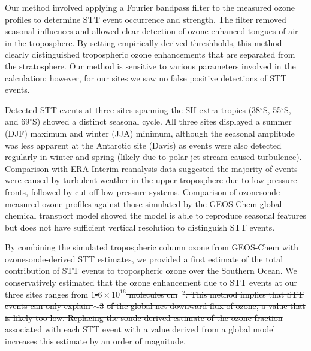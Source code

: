 \documentclass[acp, manuscript]{copernicus} %
\providecommand{\DIFadd}[1]{{\protect\color{blue}\uwave{#1}}} %
\providecommand{\DIFdel}[1]{{\protect\color{red}\sout{#1}}}                      %
\providecommand{\DIFaddbegin}{} %
\providecommand{\DIFaddend}{} %
\providecommand{\DIFdelbegin}{} %
\providecommand{\DIFdelend}{} %
\begin{document}
Our method involved applying a Fourier bandpass filter to the measured ozone profiles to determine STT event occurrence and strength.
The filter removed seasonal influences and allowed clear detection of ozone-enhanced tongues of air in the troposphere.
By setting empirically-derived threshholds, this method clearly distinguished tropospheric ozone enhancements that are separated from the stratosphere.
Our method is sensitive to various parameters involved in the calculation; however, for our sites we saw no false positive detections of STT events.

Detected STT events at three sites spanning the SH extra-tropics (38$^{\circ}$S, 55$^{\circ}$S, and 69$^{\circ}$S) showed a distinct seasonal cycle.
All three sites displayed a summer (DJF) maximum and winter (JJA) minimum, although the seasonal amplitude was less apparent at the Antarctic site (Davis) as events were also detected regularly in winter and spring (likely due to polar jet stream-caused turbulence).  %
Comparison with ERA-Interim reanalysis data suggested the majority of events were caused by turbulent weather in the upper troposphere due to low pressure fronts, followed by cut-off low pressure systems.
Comparison of ozonesonde-measured ozone profiles against those simulated by the GEOS-Chem global chemical transport model showed the model is able to reproduce seasonal features but does not have sufficient vertical resolution to distinguish STT events.

By combining the simulated tropospheric column ozone from GEOS-Chem with ozonesonde-derived STT estimates, we \DIFdelbegin \DIFdel{provided }\DIFdelend \DIFaddbegin \DIFadd{provide }\DIFaddend a first estimate of the total contribution of STT events to tropospheric ozone over the Southern Ocean.
We conservatively estimated that the ozone enhancement due to STT events at our three sites ranges from \DIFdelbegin \DIFdel{$1$-$6 \times 10^{16}$ molecules cm$^{-2}$.
This method implies that STT events can only explain $\sim$3}%
\DIFdel{of the global net downward flux of ozone, a value that is likely too low.
Replacing the sonde-derived estimate of the ozone fraction associated with each STT event with a value derived from a global model \mbox{%
\citep{Terao2008}
}%
increases this estimate by an order of magnitude.
}\DIFdelend \DIFaddbegin \DIFadd{TODO: range of local to site calculations.
}\DIFaddend 
\end{document}
